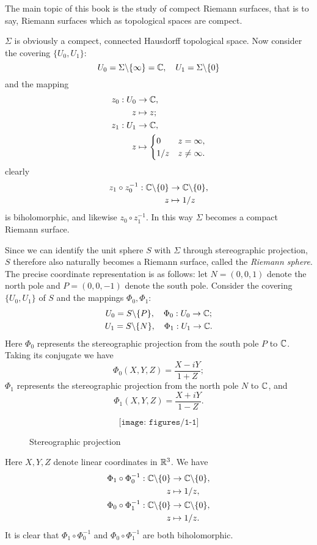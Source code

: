 The main topic of this book is the study of compect Riemann surfaces, that is to say, Riemann surfaces which as topological spaces are compect. 
\begin{example}[The set of extended complex numbers $\Sigma=\C\cup\{\infty\}$ (one point compactification of complex numbers)]
    $\Sigma$ is obviously a compect, connected Hausdorff topological space. Now consider the covering $\{U_0,U_1\}$: 
    \[U_0=\Sigma\backslash\{\infty\}=\mathbb{C}, \quad U_1=\Sigma\backslash\{0\}\]
    and the mapping 
    \begin{align*}
        z_0:U_0&\to\mathbb{C}, \\
        z&\mapsto z; \\
        z_1:U_1&\to\mathbb{C}, \\
        z&\mapsto\begin{cases}
            0&z=\infty, \\
            1/z&z\neq\infty. 
        \end{cases}
    \end{align*}
    clearly
    \begin{align*}
        z_1\circ z_0^{-1}:\mathbb{C}\backslash\{0\}&\to\mathbb{C}\backslash\{0\}, \\
        z&\mapsto1/z
    \end{align*}
    is biholomorphic, and likewise $z_0\circ z_1^{-1}$. In this way $\Sigma$ becomes a compact Riemann surface. 

    Since we can identify the unit sphere $S$ with $\Sigma$ through stereographic projection, $S$ therefore also naturally becomes a Riemann surface, called the \textit{Riemann sphere}. The precise coordinate representation is as follows: let $N=(0,0,1)$ denote the north pole and $P=(0,0,-1)$ denote the south pole. Consider the covering $\{U_0,U_1\}$ of $S$ and the mappings $\Phi_0,\Phi_1$: 
    \begin{gather*}
        U_0=S\backslash\{P\}, \quad\Phi_0:U_0\to\mathbb{C}; \\
        U_1=S\backslash\{N\}, \quad\Phi_1:U_1\to\mathbb{C}. 
    \end{gather*}
    Here $\Phi_0$ represents the stereographic projection from the south pole $P$ to $\mathbb{C}$. Taking its conjugate we have 
    \[\Phi_0(X,Y,Z)=\frac{X-iY}{1+Z}; \]
    $\Phi_1$ represents the stereographic projection from the north pole $N$ to $\mathbb{C}$, and 
    \[\Phi_1(X,Y,Z)=\frac{X+iY}{1-Z}. \]
    \begin{figure}[h]
        \[\texttt{[image: figures/1-1]}\]
        \caption{Stereographic projection}
    \end{figure}
    Here $X,Y,Z$ denote linear coordinates in $\mathbb{R}^3$. We have 
    \begin{align*}
        \Phi_1\circ\Phi_0^{-1}:\mathbb{C}\backslash\{0\}&\to\mathbb{C}\backslash\{0\}, \\
        z&\mapsto1/z, \\
        \Phi_0\circ\Phi_1^{-1}:\mathbb{C}\backslash\{0\}&\to\mathbb{C}\backslash\{0\}, \\
        z&\mapsto1/z. 
    \end{align*}
    It is clear that $\Phi_1\circ\Phi_0^{-1}$ and $\Phi_0\circ\Phi_1^{-1}$ are both biholomorphic. 


\end{example}
